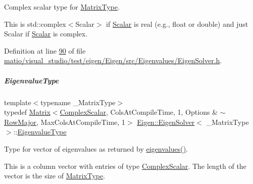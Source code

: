 Complex scalar type for \hyperlink{group___eigenvalues___module_a83acd180404ddaac8a678fa65a6b632b}{Matrix\+Type}. 

This is {\ttfamily std\+::complex$<$\+Scalar$>$} if \hyperlink{group___eigenvalues___module_a017d49fe0d59874b70a2fcf35e5aa373}{Scalar} is real (e.\+g., {\ttfamily float} or {\ttfamily double}) and just {\ttfamily Scalar} if \hyperlink{group___eigenvalues___module_a017d49fe0d59874b70a2fcf35e5aa373}{Scalar} is complex. 

Definition at line \hyperlink{matio_2visual__studio_2test_2eigen_2_eigen_2src_2_eigenvalues_2_eigen_solver_8h_source_l00090}{90} of file \hyperlink{matio_2visual__studio_2test_2eigen_2_eigen_2src_2_eigenvalues_2_eigen_solver_8h_source}{matio/visual\+\_\+studio/test/eigen/\+Eigen/src/\+Eigenvalues/\+Eigen\+Solver.\+h}.

\mbox{\label{group___eigenvalues___module_adc446bcb60572758fa64515f2825db62}} 
\subparagraph{\texorpdfstring{Eigenvalue\+Type}{EigenvalueType}\hspace{0.1cm}{\footnotesize\ttfamily [1/2]}}
{\footnotesize\ttfamily template$<$typename \+\_\+\+Matrix\+Type$>$ \\
typedef \hyperlink{group___core___module_class_eigen_1_1_matrix}{Matrix}$<$\hyperlink{group___eigenvalues___module_a4d0b2a773357d0a6ec98e026f04002ed}{Complex\+Scalar}, Cols\+At\+Compile\+Time, 1, Options \& $\sim$\hyperlink{group__enums_ggaacded1a18ae58b0f554751f6cdf9eb13acfcde9cd8677c5f7caf6bd603666aae3}{Row\+Major}, Max\+Cols\+At\+Compile\+Time, 1$>$ \hyperlink{group___eigenvalues___module_class_eigen_1_1_eigen_solver}{Eigen\+::\+Eigen\+Solver}$<$ \+\_\+\+Matrix\+Type $>$\+::\hyperlink{group___eigenvalues___module_adc446bcb60572758fa64515f2825db62}{Eigenvalue\+Type}}



Type for vector of eigenvalues as returned by \hyperlink{group___eigenvalues___module_a114189009e42f5e03372a7a3dfa33b97}{eigenvalues()}. 

This is a column vector with entries of type \hyperlink{group___eigenvalues___module_a4d0b2a773357d0a6ec98e026f04002ed}{Complex\+Scalar}. The length of the vector is the size of \hyperlink{group___eigenvalues___module_a83acd180404ddaac8a678fa65a6b632b}{Matrix\+Type}. 


